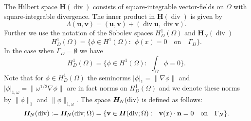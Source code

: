 \documentclass[11pt]{amsart}
\numberwithin{equation}{section}
\theoremstyle{definition}\newtheorem{example}{Example}[section]
\begin{document}
The Hilbert space ${{\boldsymbol H}}({\operatorname{div}})$ consists of square-integrable
vector-fields on ${{\Omega}}$ with square-integrable divergence. The inner product in
${{\boldsymbol H}}({\operatorname{div}})$ is given by
\begin{equation}\label{H-div-prod}
\Lambda({{\mathbf u}}, {{\mathbf v}})= ({{\mathbf u}},{{\mathbf v}}) + ({\operatorname{div}} {{\mathbf u}}, {\operatorname{div}} {{\mathbf v}}).
\end{equation}
Further we use the notation of the Sobolev spaces $H^1_D({{\Omega}})$ and ${{\boldsymbol H}}_N({\operatorname{div}})$
\begin{equation}\label{H-D}
H^1_D({{\Omega}}) = \{ \phi \in H^1({{\Omega}}): ~~\phi(x)=0 \quad \text{on} \quad \Gamma_D\}.
\end{equation}
In the case when $\Gamma_D=\emptyset$ we have
\begin{equation}\label{H-D-2}
H^1_D({{\Omega}}) = \{ \phi \in H^1({{\Omega}}): ~~\int_{\Omega}\phi=0\}.
\end{equation}
Note that for $\phi\in H^1_D({{\Omega}})$ the seminorms
$|\phi|_1=\|\nabla \phi\|$ and 
$|\phi|_{1,\omega}=\|\omega^{1/2}\nabla \phi\|$  
are in fact norms on $H^1_D(\Omega)$ and we denote these norms
by 
$\|\phi\|_1$ and $\|\phi\|_{1,\omega}$. 
The
space   ${{\boldsymbol H}_{\hspace{-0.2mm}N}}({\operatorname{div}})$ is defined as follows: 
\begin{equation}\label{H-N}
  {{\boldsymbol H}_{\hspace{-0.2mm}N}}({\operatorname{div}}) 
:= {{\boldsymbol H}_{\hspace{-0.2mm}N}}({\operatorname{div}}; {{\Omega}})= \{ {{\mathbf v}} \in {{\boldsymbol H}}({\operatorname{div}}; {{\Omega}}): ~~{{\mathbf v}}(x) \cdot {{\mathbf n}}=0 \quad \text{on} \quad \Gamma_N\}.
\end{equation}
\end{document}
